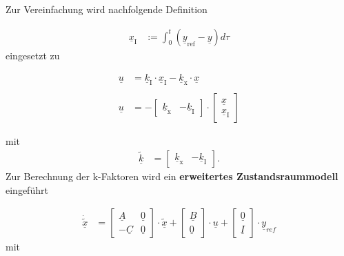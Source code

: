 Zur Vereinfachung wird nachfolgende Definition

\begin{align*}
    \underline{x}_{\mathrm{I}}& :=\int_{0}^t(\underline{y}_{\mathrm{ref}}-\underline{y})d\tau
\end{align*}
\newline
eingesetzt zu

\begin{align}
    \underline{u} &= \underline{k}_{\mathrm{I}}\cdot\underline{x}_{\mathrm{I}}-\underline{k}_{\mathrm{x}}\cdot\underline{x} \\ \nonumber \\
    \underline{u} &= -
    \begin{bmatrix}
        \underline{k}_{\mathrm{x}} & -\underline{k}_{\mathrm{I}}
    \end{bmatrix}
    \cdot
    \begin{bmatrix}
        \underline{x} \\
        \underline{x}_{\mathrm{I}}
    \end{bmatrix}
    \nonumber
\end{align}

mit
\begin{align}
    \underline{\tilde{k}} &= 
    \begin{bmatrix}
    \underline{k}_{\mathrm{x}} & -\underline{k}_{\mathrm{I}}
    \end{bmatrix}.
    \label{eq:Gleichung27}
\end{align}
Zur Berechnung der k-Faktoren wird ein \textbf{erweitertes Zustandsraummodell} eingeführt

\begin{align}
    \underline{\dot{\tilde{x}}} &= 
    \begin{bmatrix}
        \underline{A} & \underline{0} \\
        -\underline{C} & \underline{0}
    \end{bmatrix} \cdot \underline{\tilde{x}} +
    \begin{bmatrix}
        \underline{B} \\
        \underline{0}
    \end{bmatrix} \cdot\underline{u} +
    \begin{bmatrix}
        \underline{0} \\
        \underline{I}
    \end{bmatrix} \cdot\underline{y}_{ref}
    \label{eq:Gleichung28}
\end{align}
\newline
mit

